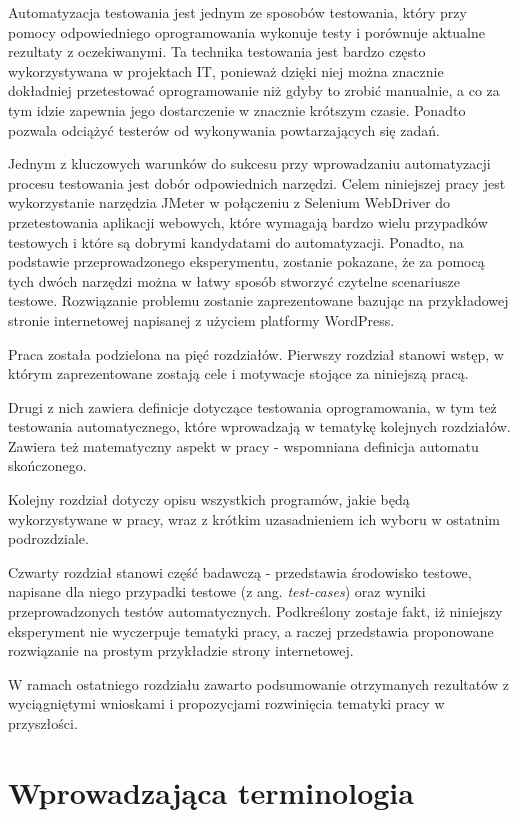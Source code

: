 \documentclass[12pt]{report}
\theoremstyle{definition}
\begin{document}
Automatyzacja testowania jest jednym ze sposobów testowania, który przy pomocy odpowiedniego oprogramowania wykonuje testy i porównuje aktualne rezultaty z oczekiwanymi. Ta technika testowania jest bardzo często wykorzystywana w projektach IT, ponieważ dzięki niej można znacznie dokładniej przetestować oprogramowanie niż gdyby to zrobić manualnie, a co za tym idzie zapewnia jego dostarczenie w znacznie krótszym czasie. Ponadto pozwala odciążyć testerów od wykonywania powtarzających się zadań. 


Jednym z kluczowych warunków do sukcesu przy wprowadzaniu automatyzacji procesu testowania jest dobór odpowiednich narzędzi. Celem niniejszej pracy jest wykorzystanie narzędzia JMeter w połączeniu z Selenium WebDriver do przetestowania aplikacji webowych, które wymagają bardzo wielu przypadków testowych i które są dobrymi kandydatami do automatyzacji. Ponadto, na podstawie przeprowadzonego eksperymentu, zostanie pokazane, że za pomocą tych dwóch narzędzi można w łatwy sposób stworzyć czytelne scenariusze testowe.  Rozwiązanie problemu zostanie zaprezentowane bazując na przykładowej stronie internetowej napisanej z użyciem platformy WordPress. 


Praca została podzielona na pięć rozdziałów. Pierwszy rozdział stanowi wstęp, w którym zaprezentowane zostają cele i motywacje stojące za niniejszą pracą. 


Drugi z nich zawiera definicje dotyczące testowania oprogramowania, w tym też testowania automatycznego, które wprowadzają w tematykę kolejnych rozdziałów. Zawiera też matematyczny aspekt w pracy - wspomniana definicja automatu skończonego.


Kolejny rozdział dotyczy opisu wszystkich programów, jakie będą wykorzystywane w pracy, wraz z krótkim uzasadnieniem ich wyboru w ostatnim podrozdziale. 


Czwarty rozdział stanowi część badawczą - przedstawia środowisko testowe, napisane dla niego przypadki testowe (z ang. \textit{test-cases}) oraz wyniki przeprowadzonych testów automatycznych. Podkreślony zostaje fakt, iż niniejszy eksperyment nie wyczerpuje tematyki pracy, a raczej przedstawia proponowane rozwiązanie na prostym przykładzie strony internetowej.

W ramach ostatniego rozdziału zawarto podsumowanie otrzymanych rezultatów z wyciągniętymi wnioskami i propozycjami rozwinięcia tematyki pracy w przyszłości.


\chapter{Wprowadzająca terminologia} \ \ \
\end{document}
